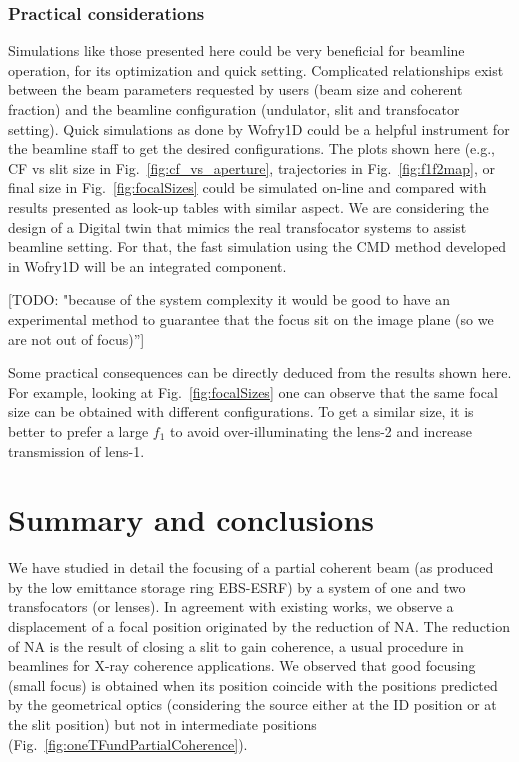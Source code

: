 \documentclass{iucr}              %
\newcommand{\todo}[1]{{\color{red}[TODO: "#1'']}}
\begin{document}
\subsubsection{Practical considerations} Simulations like those presented here could be very beneficial for beamline operation, for its optimization and quick setting.  Complicated  relationships exist between the beam parameters requested by users (beam size and coherent fraction) and the beamline configuration (undulator, slit and transfocator setting). Quick simulations as done by Wofry1D could be a helpful instrument for the beamline staff to get the desired configurations. The plots shown here (e.g., CF vs slit size in Fig.~\ref{fig:cf_vs_aperture}, trajectories in Fig.~\ref{fig:f1f2map}, or final size in Fig.~\ref{fig:focalSizes} could be simulated on-line and compared with results presented as look-up tables with similar aspect. We are considering the design of a Digital twin that mimics the real transfocator systems to assist beamline setting. For that, the fast simulation using the CMD method developed in Wofry1D will be an integrated component.  

\todo{because of the system complexity it would be good to have an experimental method to guarantee that the focus sit on the image plane (so we are not out of focus)}

Some practical consequences can be directly deduced from the results shown here. For example, looking at Fig.~\ref{fig:focalSizes} one can observe that the same focal size can be obtained with different configurations. To get a similar size, it is better to prefer a large $f_1$ to avoid over-illuminating the lens-2 and increase transmission of lens-1.




\section{Summary and conclusions}
\label{sec:summary}

We have studied in detail the focusing of a partial coherent beam (as produced by the low emittance storage ring EBS-ESRF) by a system of one and two transfocators (or lenses). In agreement with existing works, we observe a displacement of a focal position originated by the reduction of NA. The reduction of NA is the result of closing a slit to gain coherence, a usual procedure in beamlines for X-ray coherence applications. We observed that good focusing (small focus) is obtained when its position coincide with the positions predicted by the geometrical optics (considering the source either at the ID position or at the slit position) but not in intermediate positions (Fig.~\ref{fig:oneTFundPartialCoherence}).
\end{document}
